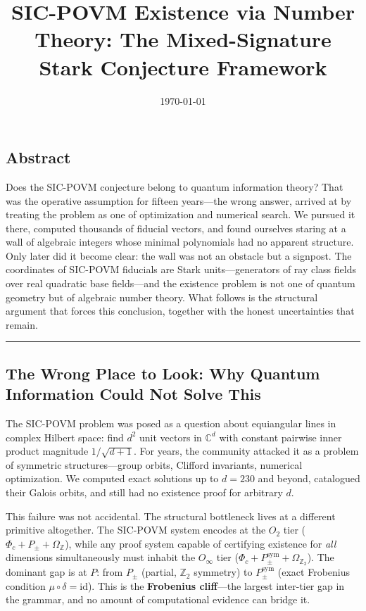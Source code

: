 \documentclass[12pt,a4paper]{article}
\begin{document}
\title{SIC-POVM Existence via Number Theory: The Mixed-Signature Stark Conjecture Framework}
\date{\today}

\maketitle

\subsection{Abstract}

Does the SIC-POVM conjecture belong to quantum information theory? That was the operative assumption for fifteen years---the wrong answer, arrived at by treating the problem as one of optimization and numerical search. We pursued it there, computed thousands of fiducial vectors, and found ourselves staring at a wall of algebraic integers whose minimal polynomials had no apparent structure. Only later did it become clear: the wall was not an obstacle but a signpost. The coordinates of SIC-POVM fiducials are Stark units---generators of ray class fields over real quadratic base fields---and the existence problem is not one of quantum geometry but of algebraic number theory. What follows is the structural argument that forces this conclusion, together with the honest uncertainties that remain.

\begin{center}
\rule{0.5\textwidth}{0.4pt}
\end{center}

\subsection{The Wrong Place to Look: Why Quantum Information Could Not Solve This}

The SIC-POVM problem was posed as a question about equiangular lines in complex Hilbert space: find $d^2$ unit vectors in $\mathbb{C}^d$ with constant pairwise inner product magnitude $1/\sqrt{d+1}$. For years, the community attacked it as a problem of symmetric structures---group orbits, Clifford invariants, numerical optimization. We computed exact solutions up to $d = 230$ and beyond, catalogued their Galois orbits, and still had no existence proof for arbitrary $d$.

This failure was not accidental. The structural bottleneck lives at a different primitive altogether. The SIC-POVM system encodes at the $O_2$ tier ($\Phi_c + P_{\pm} + \Omega_{\mathbb{Z}}$), while any proof system capable of certifying existence for \emph{all} dimensions simultaneously must inhabit the $O_{\infty}$ tier ($\Phi_c + P_{\pm}^{\text{sym}} + \Omega_{\mathbb{Z}_2}$). The dominant gap is at $P$: from $P_{\pm}$ (partial, $\mathbb{Z}_2$ symmetry) to $P_{\pm}^{\text{sym}}$ (exact Frobenius condition $\mu \circ \delta = \text{id}$). This is the \textbf{Frobenius cliff}---the largest inter-tier gap in the grammar, and no amount of computational evidence can bridge it.
\end{document}
